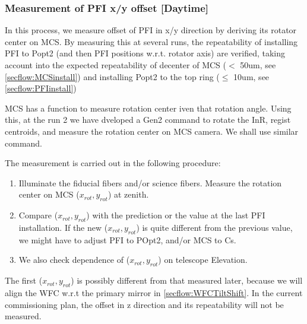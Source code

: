 \subsubsection{Measurement of PFI x/y offset [Daytime]}\label{secflow:PFIoffset}

In this process, we measure offset of PFI in x/y direction by deriving its rotator center on MCS.
By measuring this at several runs, the repeatability of installing PFI to Popt2 (and then PFI positions w.r.t. rotator axis) are verified, taking account into the expected repeatability of decenter of MCS ($<$ 50um, see \ref{secflow:MCSinstall}) and installing Popt2 to the top ring ($\leq$ 10um, see \ref{secflow:PFIinstall})

MCS has a function to measure rotation center iven that rotation angle.
Using this, at the run 2 we have dveloped a Gen2 command to rotate the InR, regist centroids, and measure the rotation center on MCS camera.
We shall use similar command.

The measurement is carried out in the following procedure:
\begin{enumerate}
\item Illuminate the fiducial fibers and/or science fibers. 
Measure the rotation center on MCS ($x_{rot}, y_{rot}$) at zenith.
\item Compare ($x_{rot}, y_{rot}$) with the prediction or the value at the last PFI installation. 
If the new ($x_{rot}, y_{rot}$) is quite different from the previous value, we might have to adjust PFI to POpt2, and/or MCS to Cs.
\item We also check dependence of ($x_{rot}, y_{rot}$) on telescope Elevation.
\end{enumerate}

The first ($x_{rot}, y_{rot}$) is possibly different from that measured later, because we will align the WFC w.r.t the primary mirror in \ref{secflow:WFCTiltShift}.
In the current commissioning plan, the offset in z direction and its repeatability will not be measured.

